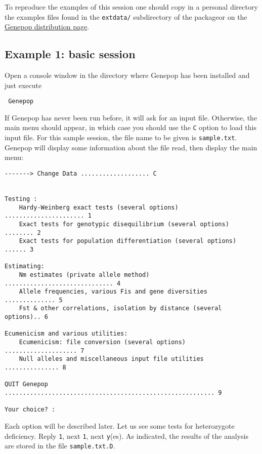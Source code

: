 \documentclass[12pt,]{book}
\begin{document}
To reproduce the examples of this session one should copy in a personal
directory the examples files found in the \texttt{extdata/} subdirectory
of the packageor on the
\href{http://kimura.univ-montp2.fr/~rousset/Genepop.htm}{Genepop
distribution page}.

\subsection{Example 1: basic session}\label{example-1-basic-session}

Open a console window in the directory where Genepop has been installed
and just execute

\begin{verbatim}
 Genepop
\end{verbatim}

If Genepop has never been run before, it will ask for an input file.
Otherwise, the main menu should appear, in which case you should use the
\texttt{C} option to load this input file. For this sample session, the
file name to be given is \texttt{sample.txt}. Genepop will display some
information about the file read, then display the main menu:

\begin{verbatim}
-------> Change Data ................... C


Testing :
    Hardy-Weinberg exact tests (several options) ...................... 1
    Exact tests for genotypic disequilibrium (several options) ........ 2
    Exact tests for population differentiation (several options) ...... 3

Estimating:
    Nm estimates (private allele method) .............................. 4
    Allele frequencies, various Fis and gene diversities .............. 5
    Fst & other correlations, isolation by distance (several options).. 6

Ecumenicism and various utilities:
    Ecumenicism: file conversion (several options) .................... 7
    Null alleles and miscellaneous input file utilities ............... 8

QUIT Genepop .......................................................... 9

Your choice? :
\end{verbatim}

Each option will be described later. Let us see some tests for
heterozygote deficiency. Reply \texttt{1}, next \texttt{1}, next
\texttt{y}(es). As indicated, the results of the analysis are stored in
the file \texttt{sample.txt.D}.
\end{document}

